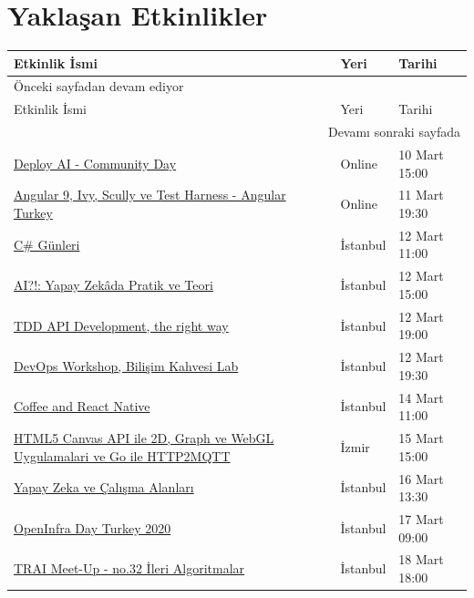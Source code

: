 \documentclass[11pt]{article}
\begin{document}
\section{Yaklaşan Etkinlikler}
\label{sec:org2a4ce60}
\begin{longtable}{|p{8cm}|l|l|}
\hline
Etkinlik İsmi & Yeri & Tarihi\\
\hline
\endfirsthead
\multicolumn{3}{l}{Önceki sayfadan devam ediyor} \\
\hline

Etkinlik İsmi & Yeri & Tarihi \\

\hline
\endhead
\hline\multicolumn{3}{r}{Devamı sonraki sayfada} \\
\endfoot
\endlastfoot
\hline
\href{https://www.meetup.com/Open-Source-Analytics-Istanbul/events/269198806/}{Deploy AI - Community Day} & Online & 10 Mart 15:00\\
\href{https://kommunity.com/ngturkey/events/webinar-angular-9-ivy-scully-ve-test-harness-angular-turkey}{Angular 9, Ivy, Scully ve Test Harness - Angular Turkey} & Online & 11 Mart 19:30\\
\href{https://www.meetup.com/bilisimtoplulugu/events/269127026/}{C\# Günleri} & İstanbul & 12 Mart 11:00\\
\href{https://www.meetup.com/istanbul-yapay-zeka-toplulugu/events/269128397/}{AI?!: Yapay Zekâda Pratik ve Teori} & İstanbul & 12 Mart 15:00\\
\href{https://www.meetup.com/laravelistanbul/events/269059351/}{TDD API Development, the right way} & İstanbul & 12 Mart 19:00\\
\href{https://kommunity.com/btorgtr/events/devops-workshop-bilisim-kahvesi-lab}{DevOps Workshop, Bilişim Kahvesi Lab} & İstanbul & 12 Mart 19:30\\
\href{https://www.meetup.com/Coffee-And-React-Native-\%25C4\%25B0stanbul/events/hhtdprybcfbsb/}{Coffee and React Native} & İstanbul & 14 Mart 11:00\\
\href{https://www.meetup.com/IzmirGophers/events/269152779/}{HTML5 Canvas API ile 2D, Graph ve WebGL Uygulamalari ve Go ile HTTP2MQTT} & İzmir & 15 Mart 15:00\\
\href{https://www.meetup.com/bilisimtoplulugu/events/269153853/}{Yapay Zeka ve Çalışma Alanları} & İstanbul & 16 Mart 13:30\\
\href{https://kommunity.com/turkey-openstack-meetup/events/openinfra-day-turkey}{OpenInfra Day Turkey 2020} & İstanbul & 17 Mart 09:00\\
\href{https://www.meetup.com/Turkiye-Yapay-Zeka-\%25C4\%25B0nisiyatifi/events/xztxmrybcfbxb/}{TRAI Meet-Up - no.32 İleri Algoritmalar} & İstanbul & 18 Mart 18:00\\

\end{longtable}
\end{document}
